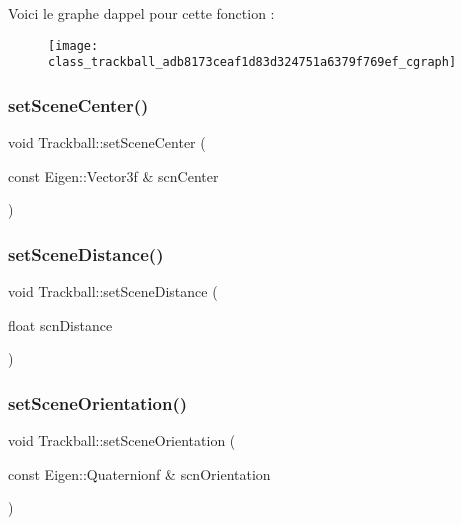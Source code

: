 Voici le graphe d\textquotesingle{}appel pour cette fonction \+:\nopagebreak
\begin{figure}[H]
\begin{center}
\leavevmode
\texttt{[image: class\_trackball\_adb8173ceaf1d83d324751a6379f769ef\_cgraph]}
\end{center}
\end{figure}
\mbox{\label{class_trackball_a279072f30b8e41189b05ce0a1caf36a0}} 
\subsubsection{\texorpdfstring{set\+Scene\+Center()}{setSceneCenter()}}
{\footnotesize\ttfamily void Trackball\+::set\+Scene\+Center (\begin{DoxyParamCaption}\item[{const Eigen\+::\+Vector3f \&}]{scn\+Center }\end{DoxyParamCaption})}

\mbox{\label{class_trackball_a20407b903581f2e34ca12592f8e0c41a}} 
\subsubsection{\texorpdfstring{set\+Scene\+Distance()}{setSceneDistance()}}
{\footnotesize\ttfamily void Trackball\+::set\+Scene\+Distance (\begin{DoxyParamCaption}\item[{float}]{scn\+Distance }\end{DoxyParamCaption})}

\mbox{\label{class_trackball_a0260225e8b58034f6bbc030a35c400e1}} 
\subsubsection{\texorpdfstring{set\+Scene\+Orientation()}{setSceneOrientation()}}
{\footnotesize\ttfamily void Trackball\+::set\+Scene\+Orientation (\begin{DoxyParamCaption}\item[{const Eigen\+::\+Quaternionf \&}]{scn\+Orientation }\end{DoxyParamCaption})}

